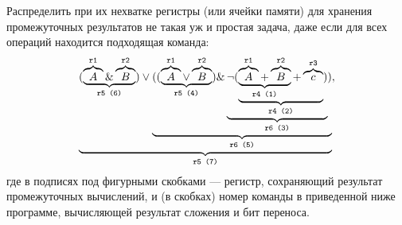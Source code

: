 Распределить при их нехватке регистры (или ячейки памяти) для хранения промежуточных результатов не такая уж и простая задача, даже если для всех операций находится подходящая команда:
\[
    \underbrace{
        (\underbrace{
            \overbrace{A}^{\texttt{r1}}
            \& 
            \overbrace{B}^{\texttt{r2}}
        }_{\texttt{r5 (6)}})
        \lor 
        \underbrace{(
            (\underbrace{
                \overbrace{A}^{\texttt{r1}} 
                \lor 
                \overbrace{B}^{\texttt{r2}}
            }_{\texttt{r5 (4)}})
            \& 
            \underbrace{
                \lnot
                (\underbrace{
                    \underbrace{
                        \overbrace{A}^{\texttt{r1}}
                        + 
                        \overbrace{B}^{\texttt{r2}}
                    }_{\texttt{r4 (1)}}
                    + 
                    \overbrace{c}^{\texttt{r3}}
                }_{\texttt{r4 (2)}})
            }_{\texttt{r6 (3)}}
        )}_{\texttt{r6 (5)}}
    }_{\texttt{r5 (7)}},
\]
где в подписях под фигурными скобками --- регистр, сохраняющий результат промежуточных вычислений, и (в скобках) номер команды в приведенной ниже программе, вычисляющей результат сложения и бит переноса.

\begin{algorithmic}[1]
    
     
     
     
     
     
     
     
     
     
\end{algorithmic}
